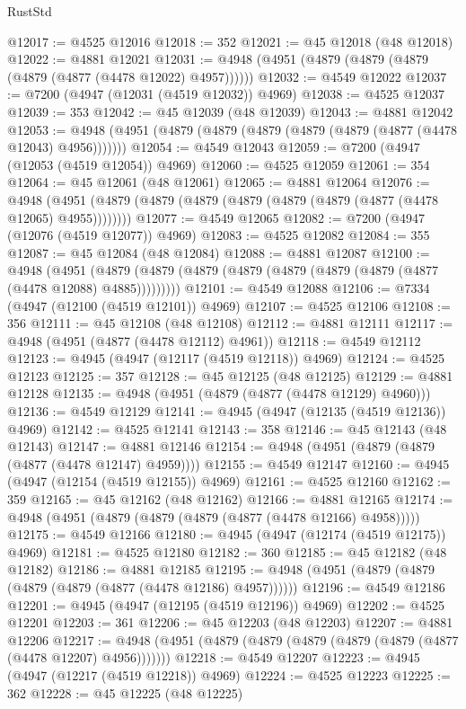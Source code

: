\begin{lexlean}{RustStd}
\begin{coremodule}
@12017 := @4525 @12016
@12018 := 352
@12021 := @45 @12018 (@48 @12018)
@12022 := @4881 @12021
@12031 := @4948 (@4951 (@4879 (@4879 (@4879 (@4879 (@4877 (@4478 @12022) @4957))))))
@12032 := @4549 @12022
@12037 := @7200 (@4947 (@12031 (@4519 @12032)) @4969)
@12038 := @4525 @12037
@12039 := 353
@12042 := @45 @12039 (@48 @12039)
@12043 := @4881 @12042
@12053 := @4948 (@4951 (@4879 (@4879 (@4879 (@4879 (@4879 (@4877 (@4478 @12043) @4956)))))))
@12054 := @4549 @12043
@12059 := @7200 (@4947 (@12053 (@4519 @12054)) @4969)
@12060 := @4525 @12059
@12061 := 354
@12064 := @45 @12061 (@48 @12061)
@12065 := @4881 @12064
@12076 := @4948 (@4951 (@4879 (@4879 (@4879 (@4879 (@4879 (@4879 (@4877 (@4478 @12065) @4955))))))))
@12077 := @4549 @12065
@12082 := @7200 (@4947 (@12076 (@4519 @12077)) @4969)
@12083 := @4525 @12082
@12084 := 355
@12087 := @45 @12084 (@48 @12084)
@12088 := @4881 @12087
@12100 := @4948
    (@4951 (@4879 (@4879 (@4879 (@4879 (@4879 (@4879 (@4879 (@4877 (@4478 @12088) @4885)))))))))
@12101 := @4549 @12088
@12106 := @7334 (@4947 (@12100 (@4519 @12101)) @4969)
@12107 := @4525 @12106
@12108 := 356
@12111 := @45 @12108 (@48 @12108)
@12112 := @4881 @12111
@12117 := @4948 (@4951 (@4877 (@4478 @12112) @4961))
@12118 := @4549 @12112
@12123 := @4945 (@4947 (@12117 (@4519 @12118)) @4969)
@12124 := @4525 @12123
@12125 := 357
@12128 := @45 @12125 (@48 @12125)
@12129 := @4881 @12128
@12135 := @4948 (@4951 (@4879 (@4877 (@4478 @12129) @4960)))
@12136 := @4549 @12129
@12141 := @4945 (@4947 (@12135 (@4519 @12136)) @4969)
@12142 := @4525 @12141
@12143 := 358
@12146 := @45 @12143 (@48 @12143)
@12147 := @4881 @12146
@12154 := @4948 (@4951 (@4879 (@4879 (@4877 (@4478 @12147) @4959))))
@12155 := @4549 @12147
@12160 := @4945 (@4947 (@12154 (@4519 @12155)) @4969)
@12161 := @4525 @12160
@12162 := 359
@12165 := @45 @12162 (@48 @12162)
@12166 := @4881 @12165
@12174 := @4948 (@4951 (@4879 (@4879 (@4879 (@4877 (@4478 @12166) @4958)))))
@12175 := @4549 @12166
@12180 := @4945 (@4947 (@12174 (@4519 @12175)) @4969)
@12181 := @4525 @12180
@12182 := 360
@12185 := @45 @12182 (@48 @12182)
@12186 := @4881 @12185
@12195 := @4948 (@4951 (@4879 (@4879 (@4879 (@4879 (@4877 (@4478 @12186) @4957))))))
@12196 := @4549 @12186
@12201 := @4945 (@4947 (@12195 (@4519 @12196)) @4969)
@12202 := @4525 @12201
@12203 := 361
@12206 := @45 @12203 (@48 @12203)
@12207 := @4881 @12206
@12217 := @4948 (@4951 (@4879 (@4879 (@4879 (@4879 (@4879 (@4877 (@4478 @12207) @4956)))))))
@12218 := @4549 @12207
@12223 := @4945 (@4947 (@12217 (@4519 @12218)) @4969)
@12224 := @4525 @12223
@12225 := 362
@12228 := @45 @12225 (@48 @12225)

\end{coremodule}
\end{lexlean}
